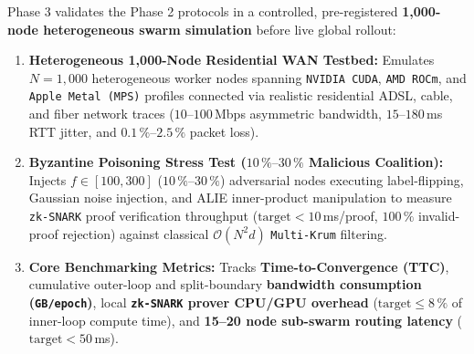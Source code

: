 \documentclass[11pt,a4paper]{article}
\begin{document}
Phase 3 validates the Phase 2 protocols in a controlled, pre-registered \textbf{1{,}000-node heterogeneous swarm simulation} before live global rollout:
\begin{enumerate}[leftmargin=1.8em]
    \item \textbf{Heterogeneous 1,000-Node Residential WAN Testbed:} Emulates $N = 1{,}000$ heterogeneous worker nodes spanning \texttt{NVIDIA CUDA}, \texttt{AMD ROCm}, and \texttt{Apple Metal (MPS)} profiles connected via realistic residential ADSL, cable, and fiber network traces ($10\text{--}100$\,Mbps asymmetric bandwidth, $15\text{--}180$\,ms RTT jitter, and $0.1\,\%\text{--}2.5\,\%$ packet loss).
    \item \textbf{Byzantine Poisoning Stress Test ($10\,\%\text{--}30\,\%$ Malicious Coalition):} Injects $f \in [100, 300]$ ($10\,\%\text{--}30\,\%$) adversarial nodes executing label-flipping, Gaussian noise injection, and ALIE inner-product manipulation to measure \texttt{zk-SNARK} proof verification throughput ($\text{target} < 10$\,ms/proof, $100\,\%$ invalid-proof rejection) against classical $\mathcal{O}(N^2 d)$ \texttt{Multi-Krum} filtering.
    \item \textbf{Core Benchmarking Metrics:} Tracks \textbf{Time-to-Convergence (TTC)}, cumulative outer-loop and split-boundary \textbf{bandwidth consumption (\texttt{GB/epoch})}, local \textbf{\texttt{zk-SNARK} prover CPU/GPU overhead} ($\text{target} \le 8\,\%$ of inner-loop compute time), and \textbf{15--20 node sub-swarm routing latency} ($\text{target} < 50$\,ms).
\end{enumerate}
\end{document}
